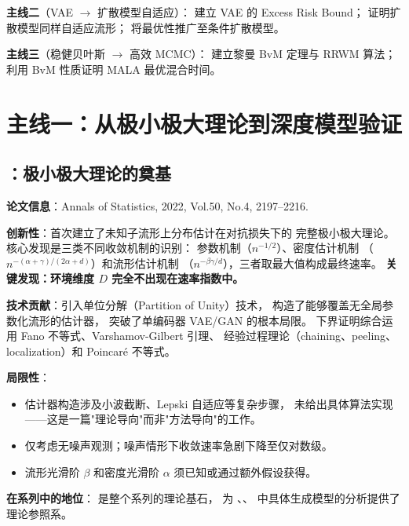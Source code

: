 \textbf{主线二}（VAE $\to$ 扩散模型自适应）：
\citep{tang2021vae} 建立 VAE 的 Excess Risk Bound；
\citep{tang2024diffusion} 证明扩散模型同样自适应流形；
\citep{tang2025conditional} 将最优性推广至条件扩散模型。

\textbf{主线三}（稳健贝叶斯 $\to$ 高效 MCMC）：
\citep{tang2023robust} 建立黎曼 BvM 定理与 RRWM 算法；
\citep{tang2024mala} 利用 BvM 性质证明 MALA 最优混合时间。

\section{主线一：从极小极大理论到深度模型验证}\label{sec:line1}

\subsection{\citep{tang2022minimax}：极小极大理论的奠基}\label{sec:ch0-annals2022}

\textbf{论文信息}：Annals of Statistics, 2022, Vol.50, No.4, 2197--2216.

\textbf{创新性}：首次建立了未知子流形上分布估计在对抗损失下的
完整极小极大理论。核心发现是三类不同收敛机制的识别：
参数机制（$n^{-1/2}$）、密度估计机制
（$n^{-(\alpha+\gamma)/(2\alpha+d)}$）和流形估计机制
（$n^{-\beta\gamma/d}$），三者取最大值构成最终速率。
\textbf{关键发现：环境维度 $D$ 完全不出现在速率指数中。}

\textbf{技术贡献}：引入单位分解（Partition of Unity）技术，
构造了能够覆盖无全局参数化流形的估计器，
突破了单编码器 VAE/GAN 的根本局限。
下界证明综合运用 Fano 不等式、Varshamov-Gilbert 引理、
经验过程理论（chaining、peeling、localization）和 Poincaré 不等式。

\textbf{局限性}：

\begin{itemize}
    \item 估计器构造涉及小波截断、Lepski 自适应等复杂步骤，
          未给出具体算法实现——这是一篇"理论导向"而非"方法导向"的工作。
    \item 仅考虑无噪声观测；噪声情形下收敛速率急剧下降至仅对数级。
    \item 流形光滑阶 $\beta$ 和密度光滑阶 $\alpha$ 须已知或通过额外假设获得。
\end{itemize}

\textbf{在系列中的地位}：
\citep{tang2022minimax} 是整个系列的理论基石，
为 \citep{tang2023lowdim}、\citep{tang2024diffusion}、
\citep{tang2025regression} 中具体生成模型的分析提供了理论参照系。

